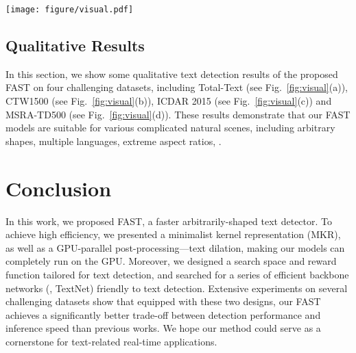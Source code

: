 \documentclass[lettersize,journal]{IEEEtran}
\begin{document}
\begin{figure*}[!t]
    \centering
    \texttt{[image: figure/visual.pdf]}
    \caption{
    Qualitative text detection results of FAST on Total-Text \cite{ch2017total}, CTW1500 \cite{yuliang2017detecting}, ICDAR 2015 \cite{karatzas2015icdar} and MSRA-TD500 \cite{yao2012detecting}.
    These results show that our FAST models are suitable for various complicated natural scenes, including arbitrary shapes, multiple languages, and extreme aspect ratios.
    }
    \label{fig:visual}
\end{figure*}

\subsection{Qualitative Results}

In this section, we show some qualitative text detection results of the proposed FAST on four challenging datasets, including Total-Text (see Fig.~\ref{fig:visual}(a)), CTW1500 (see Fig.~\ref{fig:visual}(b)), ICDAR 2015 (see Fig.~\ref{fig:visual}(c)) and MSRA-TD500 (see Fig.~\ref{fig:visual}(d)). 
These results demonstrate that our FAST models are suitable for various complicated natural scenes, including arbitrary shapes, multiple languages, extreme aspect ratios, \etc.







\section{Conclusion}

In this work, we proposed FAST, a faster arbitrarily-shaped text detector.
To achieve high efficiency,
we presented a minimalist kernel representation (MKR), as well as a GPU-parallel post-processing---text dilation, making our models can completely run on the GPU.
Moreover, we designed a search space and reward function tailored for text detection, and searched for a series of efficient backbone networks (\ie, TextNet) friendly to text detection.
Extensive experiments on several challenging datasets show that equipped with these two designs, our FAST achieves a significantly better trade-off between detection performance and inference speed than previous works. 
We hope our method could serve as a cornerstone for text-related real-time applications.






\newpage




\newpage














\vfill
\end{document}
